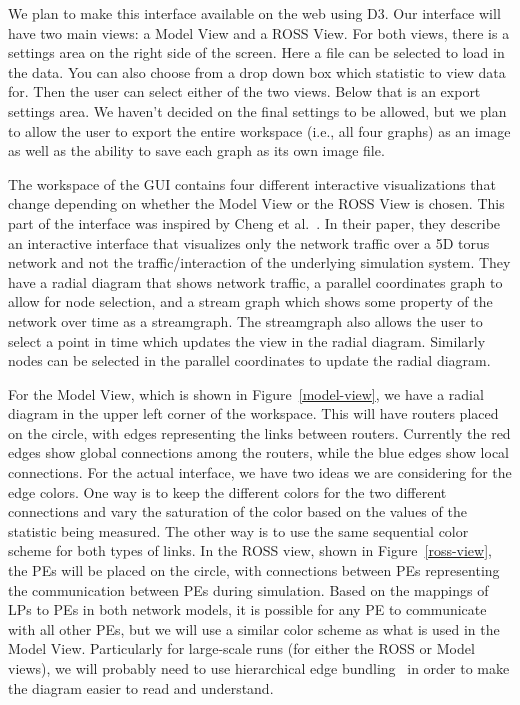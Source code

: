 \documentclass{acm_proc_article-sp}
\begin{document}
We plan to make this interface available on the web using D3.  Our interface will have two main views: a Model View and a ROSS View.  For both views, there is a settings area on the right side of the screen.  Here a file can be selected to load in the data.  You can also choose from a drop down box which statistic to view data for.  Then the user can select either of the two views.  Below that is an export settings area.  We haven't decided on the final settings to be allowed, but we plan to allow the user to export the entire workspace (i.e., all four graphs) as an image as well as the ability to save each graph as its own image file.  

The workspace of the GUI contains four different interactive visualizations that change depending on whether the Model View or the ROSS View is chosen.  This part of the interface was inspired by Cheng et al.~\cite{cheng}.  In their paper, they describe an interactive interface that visualizes only the network traffic over a 5D torus network and not the traffic/interaction of the underlying simulation system.  They have a radial diagram that shows network traffic, a parallel coordinates graph to allow for node selection, and a stream graph which shows some property of the network over time as a streamgraph.  The streamgraph also allows the user to select a point in time which updates the view in the radial diagram.  Similarly nodes can be selected in the parallel coordinates to update the radial diagram.

For the Model View, which is shown in Figure~\ref{model-view}, we have a radial diagram in the upper left corner of the workspace.  This will have routers placed on the circle, with edges representing the links between routers.  Currently the red edges show global connections among the routers, while the blue edges show local connections.  For the actual interface, we have two ideas we are considering for the edge colors.  One way is to keep the different colors for the two different connections and vary the saturation of the color based on the values of the statistic being measured.  The other way is to use the same sequential color scheme for both types of links.  In the ROSS view, shown in Figure~\ref{ross-view}, the PEs will be placed on the circle, with connections between PEs representing the communication between PEs during simulation.  Based on the mappings of LPs to PEs in both network models, it is possible for any PE to communicate with all other PEs, but we will use a similar color scheme as what is used in the Model View.  Particularly for large-scale runs (for either the ROSS or Model views), we will probably need to use hierarchical edge bundling~\cite{jia} in order to make the diagram easier to read and understand.  
\end{document}
